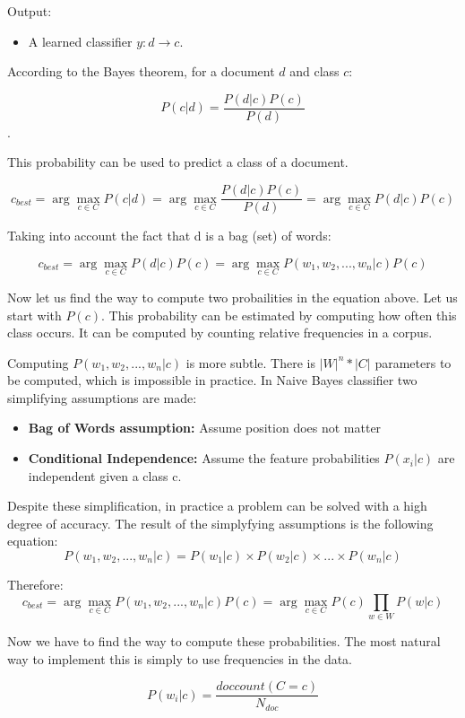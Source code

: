 \documentclass[12pt]{report}
\begin{document}
Output: 
\begin{itemize}
  \item A learned classifier $y: d \rightarrow c$.
\end{itemize}

According to the Bayes theorem, for a document $d$ and class $c$:

$$P(c | d) = \dfrac{P(d | c) P(c)}{P(d)}$$.

This probability can be used to predict a class of a document.

$$c_{best} = \arg\!\max_{c \in C} P(c | d) = \arg\!\max_{c \in C} \dfrac{P(d | c) P(c)}{P(d)} = \arg\!\max_{c \in C} {P(d | c) P(c)}$$

Taking into account the fact that d is a bag (set) of words:

$$c_{best} = \arg\!\max_{c \in C} {P(d | c) P(c)} = \arg\!\max_{c \in C} {P(w_1, w_2,..., w_n | c) P(c)}$$

Now let us find the way to compute two probailities in the equation above. Let us start with $P(c)$. This probability can be estimated by computing how often this class occurs. It can be computed by counting relative frequencies in a corpus.

Computing $P(w_1, w_2,..., w_n | c)$ is more subtle. There is $|W|^n * |C|$ parameters to be computed, which is impossible in practice. In Naive Bayes classifier two simplifying assumptions are made:

\begin{itemize}
  \item \textbf{Bag of Words assumption:} Assume position does not matter
  \item \textbf{Conditional Independence:} Assume the feature probabilities $P(x_i | c)$ are independent given a class c.
\end{itemize}

Despite these simplification, in practice a problem can be solved with a high degree of accuracy. The result of the simplyfying assumptions is the following equation:
$$P(w_1, w_2,..., w_n | c) = P(w_1 | c) \times P(w_2 | c) \times ... \times P(w_n | c)$$

Therefore:
$$c_{best} = \arg\!\max_{c \in C} {P(w_1, w_2,..., w_n | c) P(c)} = \arg\!\max_{c \in C} P(c) \prod_{w \in W} {P(w | c) }$$

Now we have to find the way to compute these probabilities. The most natural way to implement this is simply to use frequencies in the data.

$$P(w_i | c) = \dfrac{doccount(C=c)}{N_{doc}}$$
\end{document}
